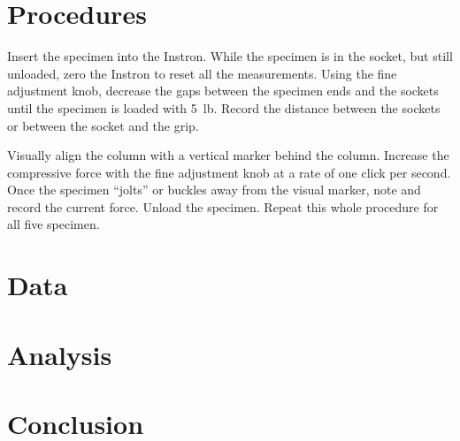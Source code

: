 \documentclass[12 pt]{article}
\begin{document}
\section{Procedures} \label{procedures}
Insert the specimen into the Instron. While the specimen is in the socket, but still unloaded, zero the Instron to reset all the measurements. Using the fine adjustment knob, decrease the gaps between the specimen ends and the sockets until the specimen is loaded with \qty{5}{lb}. Record the distance between the sockets or between the socket and the grip.

Visually align the column with a vertical marker behind the column. Increase the compressive force with the fine adjustment knob at a rate of one click per second. Once the specimen ``jolts'' or buckles away from the visual marker, note and record the current force. Unload the specimen. Repeat this whole procedure for all five specimen.

\section{Data} \label{data}


\section{Analysis} \label{analysis}

\section{Conclusion} \label{conclusion}
\end{document}
